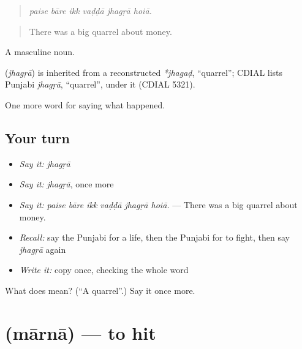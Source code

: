 \begin{quote}
     
\end{quote}

\begin{quote}
\emph{paise bāre ikk vaḍḍā jhagṛā hoiā.}
\end{quote}

\begin{quote}
There was a big quarrel about money.
\end{quote}

A masculine noun.

\begin{cousinweb}
\textbf{} (\emph{jhagṛā}) is inherited from a reconstructed \emph{*jhagaḍ}, \textquotedblleft{}quarrel\textquotedblright{}; CDIAL lists Punjabi \emph{jhagṛā}, \textquotedblleft{}quarrel\textquotedblright{}, under it (CDIAL 5321).
\end{cousinweb}

\begin{grammarlens}[title={What you've built}]
One more word for saying what happened.
\end{grammarlens}

\subsection*{Your turn}
\begin{itemize}
\raggedright
  \item \emph{Say it:} \emph{jhagṛā}
  \item \emph{Say it:} \emph{jhagṛā}, once more
  \item \emph{Say it:} \emph{paise bāre ikk vaḍḍā jhagṛā hoiā.} — There was a big quarrel about money.
  \item \emph{Recall:} say the Punjabi for a life, then the Punjabi for to fight, then say \emph{jhagṛā} again
  \item \emph{Write it:} copy \textbf{} once, checking the whole word
\end{itemize}

\begin{tcolorbox}[breakable,colback=teal!4,colframe=teal!35!black,title={Before you move on}]
What does  mean? (\textquotedblleft{}A quarrel\textquotedblright{}.) Say it once more.
\end{tcolorbox}
\section[\texorpdfstring{\pa{ਮਾਰਨਾ} (mārnā)}{ਮਾਰਨਾ (mārnā)}]{ (mārnā) — to hit}

